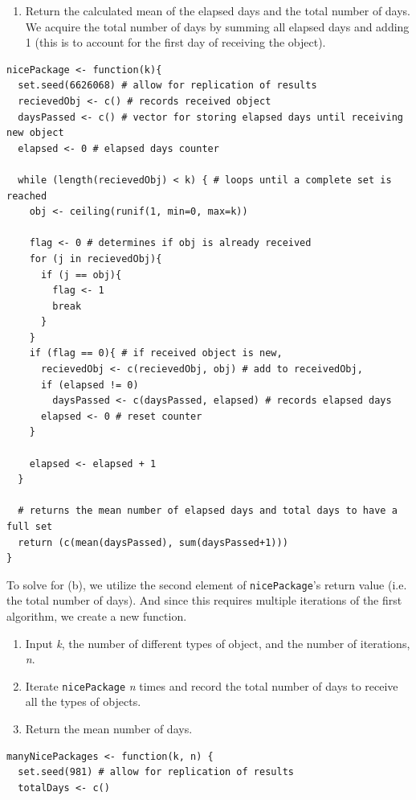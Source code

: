 \documentclass[12pt,letterpaper]{article}
\newcommand{\code}[1]{\colorbox{light-gray}{\texttt{#1}}}
\begin{document}
\begin{enumerate}[label=\Alph*]
\begin{enumerate}[label=\arabic*.]
            \item Return the calculated mean of the elapsed days and the total number of days. We acquire the total number of days by summing all elapsed days and adding 1 (this is to account for the first day of receiving the object).
        \end{enumerate}
        \newpage
        \begin{lstlisting}[title=\footnotesize Code 5.1: \code{nicePackage} function]
nicePackage <- function(k){
  set.seed(6626068) # allow for replication of results
  recievedObj <- c() # records received object
  daysPassed <- c() # vector for storing elapsed days until receiving new object
  elapsed <- 0 # elapsed days counter
  
  while (length(recievedObj) < k) { # loops until a complete set is reached
    obj <- ceiling(runif(1, min=0, max=k))
    
    flag <- 0 # determines if obj is already received
    for (j in recievedObj){
      if (j == obj){
        flag <- 1
        break
      } 
    }
    if (flag == 0){ # if received object is new,  
      recievedObj <- c(recievedObj, obj) # add to receivedObj,
      if (elapsed != 0)       
        daysPassed <- c(daysPassed, elapsed) # records elapsed days
      elapsed <- 0 # reset counter
    }
    
    elapsed <- elapsed + 1 
  }

  # returns the mean number of elapsed days and total days to have a full set
  return (c(mean(daysPassed), sum(daysPassed+1)))
}
        \end{lstlisting}

        To solve for (b), we utilize the second element of \code{nicePackage}'s return value (i.e. the total number of days). And since this requires multiple iterations of the first algorithm, we create a new function.    

        \begin{enumerate}[label=\arabic*.]
            \item Input \textit{k}, the number of different types of object, and the number of iterations, \textit{n}.
            \item Iterate \code{nicePackage} \textit{n} times and record the total number of days to receive all the types of objects.
            \item Return the mean number of days.
        \end{enumerate}

        \begin{lstlisting}[title=\footnotesize Code 5.2: \code{manyNicePackages} function]
manyNicePackages <- function(k, n) {
  set.seed(981) # allow for replication of results
  totalDays <- c()
  

\end{lstlisting}
\end{enumerate}
\end{document}

